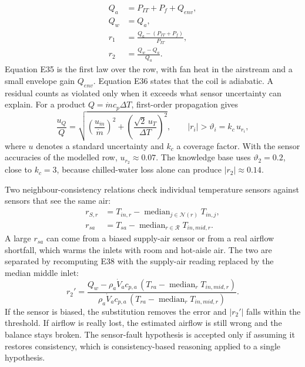 \begin{align}
  Q_a &= P_{IT} + P_f + Q_{env} , \tag{E35}\\
  Q_w &= Q_a , \tag{E36}\\
  r_1 &= \frac{Q_a - (P_{IT} + P_f)}{P_{IT}} , \tag{E37}\\
  r_2 &= \frac{Q_w - Q_a}{Q_a} . \tag{E38}
\end{align}
Equation E35 is the first law over the row, with fan heat in the airstream and a small envelope gain $Q_{env}$. Equation E36 states that the coil is adiabatic. A residual counts as violated only when it exceeds what sensor uncertainty can explain. For a product $Q = \dot m c_p \Delta T$, first-order propagation gives
\begin{equation}
  \frac{u_Q}{Q} = \sqrt{\left(\frac{u_{\dot m}}{\dot m}\right)^{2} + \left(\frac{\sqrt{2}\,u_T}{\Delta T}\right)^{2}} , \qquad
  \lvert r_i \rvert > \vartheta_i = k_c\, u_{r_i} , \tag{E39--E40}\label{eq:uncertainty}
\end{equation}
where $u$ denotes a standard uncertainty and $k_c$ a coverage factor. With the sensor accuracies of the modelled row, $u_{r_2} \approx 0.07$. The knowledge base uses $\vartheta_2 = 0.2$, close to $k_c = 3$, because chilled-water loss alone can produce $\lvert r_2 \rvert \approx 0.14$.

Two neighbour-consistency relations check individual temperature sensors against sensors that see the same air:
\begin{align}
  r_{S,r} &= T_{in,r} - \operatorname{median}_{j \in \mathcal{N}(r)} T_{in,j} , \tag{E41}\\
  r_{sa} &= T_{sa} - \operatorname{median}_{r \in \mathcal{R}} T_{in,mid,r} . \tag{E41a}
\end{align}
A large $r_{sa}$ can come from a biased supply-air sensor or from a real airflow shortfall, which warms the inlets with room and hot-aisle air. The two are separated by recomputing E38 with the supply-air reading replaced by the median middle inlet:
\begin{equation}
  r_2' = \frac{Q_w - \rho_a \dot V_a c_{p,a}\,(T_{ra} - \operatorname{median}_r T_{in,mid,r})}{\rho_a \dot V_a c_{p,a}\,(T_{ra} - \operatorname{median}_r T_{in,mid,r})} . \tag{E41b}\label{eq:e41b}
\end{equation}
If the sensor is biased, the substitution removes the error and $\lvert r_2' \rvert$ falls within the threshold. If airflow is really lost, the estimated airflow is still wrong and the balance stays broken. The sensor-fault hypothesis is accepted only if assuming it restores consistency, which is consistency-based reasoning applied to a single hypothesis.


